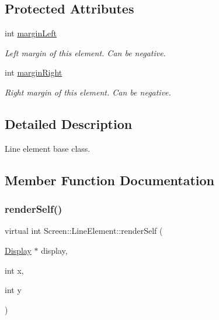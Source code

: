 \subsection*{Protected Attributes}
\begin{DoxyCompactItemize}
\item 
\mbox{\label{classScreen_1_1LineElement_a9ed23f9510a11334af9be6f53965f7a6}} 
int \mbox{\hyperlink{classScreen_1_1LineElement_a9ed23f9510a11334af9be6f53965f7a6}{margin\+Left}}
\begin{DoxyCompactList}\small\item\em Left margin of this element. Can be negative. \end{DoxyCompactList}\item 
\mbox{\label{classScreen_1_1LineElement_a3a2077f01072be8e8fd0f4539b85beb0}} 
int \mbox{\hyperlink{classScreen_1_1LineElement_a3a2077f01072be8e8fd0f4539b85beb0}{margin\+Right}}
\begin{DoxyCompactList}\small\item\em Right margin of this element. Can be negative. \end{DoxyCompactList}\end{DoxyCompactItemize}


\subsection{Detailed Description}
Line element base class. 

\subsection{Member Function Documentation}
\mbox{\label{classScreen_1_1LineElement_a667fbf6505fbed274ca9a3deac3fef9e}} 
\subsubsection{\texorpdfstring{render\+Self()}{renderSelf()}}
{\footnotesize\ttfamily virtual int Screen\+::\+Line\+Element\+::render\+Self (\begin{DoxyParamCaption}\item[{\mbox{\hyperlink{classDisplay}{Display}} $\ast$}]{display,  }\item[{int}]{x,  }\item[{int}]{y }\end{DoxyParamCaption})\hspace{0.3cm}{\ttfamily [pure virtual]}}



